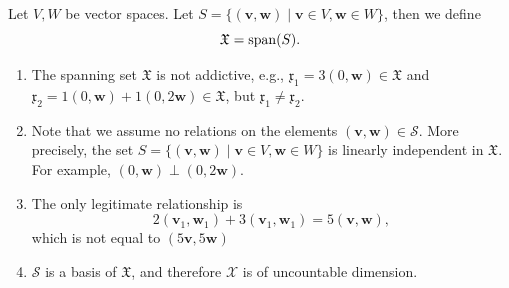 \begin{definition}
Let $V,W$ be vector spaces. Let $S = \{(\bm v,\bm w)\mid \bm v\in V,\bm w\in W\}$, then we define
\[
\mathfrak{X} = \operatorname{span}(S).
\]
\end{definition}
\begin{remark}
\begin{enumerate}
\item
The spanning set $\mathfrak{X}$ is not addictive, e.g., $\mathfrak{x}_1=3(0,\bm w)\in\mathfrak{X}$ and $\mathfrak{x}_2=1(0,\bm w)+1(0,2\bm w)\in\mathfrak{X}$, but $\mathfrak{x}_1\ne\mathfrak{x}_2$.
\item
Note that we assume no relations on the elements $(\bm v,\bm w)\in\mathcal{S}$.
More precisely, the set $S=\{(\bm v,\bm w)\mid \bm v\in V,\bm w\in W\}$ is linearly independent in $\mathfrak{X}$.
For example, $(0,\bm w)\perp(0,2\bm w)$.
\item
The only legitimate relationship is
\[
2(\bm v_1,\bm w_1) + 3(\bm v_1,\bm w_1) = 5(\bm v,\bm w),
\]
which is not equal to $(5\bm v,5\bm w)$
\item
$\mathcal{S}$ is a basis of $\mathfrak{X}$, and therefore $\mathcal{X}$ is of uncountable dimension.
\end{enumerate}
\end{remark}


